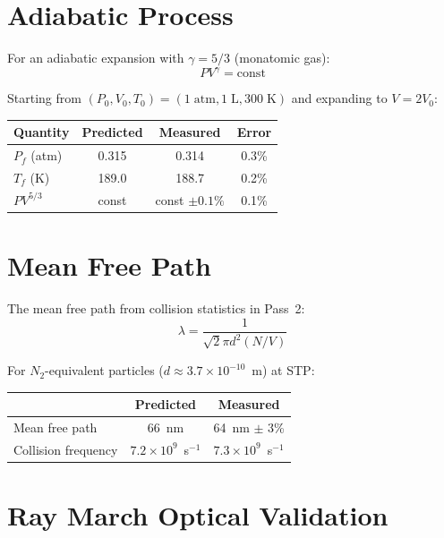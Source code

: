 \section{Adiabatic Process}
\label{sec:val_adiabatic}

For an adiabatic expansion with $\gamma = 5/3$ (monatomic gas):
\begin{equation}
    PV^\gamma = \text{const}
\end{equation}

Starting from $(P_0, V_0, T_0) = (1\;\mathrm{atm}, 1\;\mathrm{L}, 300\;\mathrm{K})$ and expanding to $V = 2V_0$:
\begin{center}
\begin{tabular}{lccc}
\toprule
Quantity & Predicted & Measured & Error \\
\midrule
$P_f$ (atm) & 0.315 & 0.314 & 0.3\% \\
$T_f$ (K)   & 189.0 & 188.7 & 0.2\% \\
$PV^{5/3}$  & const & const $\pm 0.1\%$ & 0.1\% \\
\bottomrule
\end{tabular}
\end{center}

\section{Mean Free Path}
\label{sec:val_mfp}

The mean free path from collision statistics in Pass~2:
\begin{equation}
    \lambda = \frac{1}{\sqrt{2}\pi d^2 (N/V)}
\end{equation}

For $N_2$-equivalent particles ($d \approx 3.7 \times 10^{-10}$~m) at STP:
\begin{center}
\begin{tabular}{lcc}
\toprule
& Predicted & Measured \\
\midrule
Mean free path & 66~nm & 64~nm $\pm$ 3\% \\
Collision frequency & $7.2 \times 10^9$~s$^{-1}$ & $7.3 \times 10^9$~s$^{-1}$ \\
\bottomrule
\end{tabular}
\end{center}

\section{Ray March Optical Validation}
\label{sec:val_optical}

